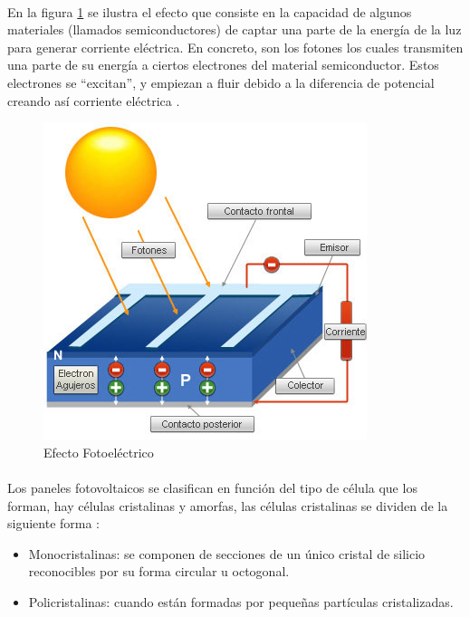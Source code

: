 \paragraph{}
En la figura \ref{fig:Efecto Fotoelectrico} se ilustra el efecto que consiste en la capacidad de algunos materiales (llamados semiconductores) de captar una parte de la energía de la luz para generar corriente eléctrica. En concreto, son los fotones los cuales transmiten una parte de su energía a ciertos electrones del material semiconductor. Estos electrones se “excitan”, y empiezan a fluir debido a la diferencia de potencial creando así corriente eléctrica \citep{MarcoTeorico2}.

\begin{figure}[H]
	\centering
	\includegraphics[scale=.50]{Capitulo2/images/celula-fotovoltaica.jpg}
	\caption{Efecto Fotoeléctrico}
	\label{fig:Efecto Fotoelectrico}
\end{figure}

\paragraph{}
Los paneles fotovoltaicos se clasifican en función del tipo de célula que los forman, hay células cristalinas y amorfas, las células cristalinas se dividen de la siguiente forma :

\begin{itemize}
	\item Monocristalinas: se componen de secciones de un único cristal de silicio reconocibles por su forma circular u octogonal.
	\item Policristalinas: cuando están formadas por pequeñas partículas cristalizadas.
\end{itemize}


